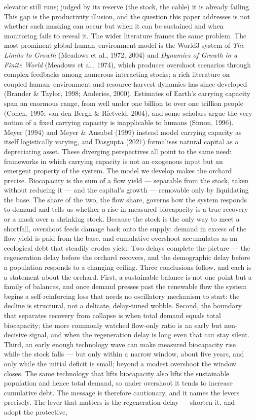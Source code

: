 \documentclass[11pt]{article}
\begin{document}
elevator still runs; judged by its reserve (the stock, the cable) it is already failing. This gap is the productivity illusion, and the question this paper addresses is not whether such masking can occur but when it can be sustained and when monitoring fails to reveal it. The wider literature frames the same problem. The most prominent global human–environment model is the World3 system of \emph{The Limits to Growth} (Meadows et al., 1972, 2004) and \emph{Dynamics of Growth in a Finite World} (Meadows et al., 1974), which produces overshoot scenarios through complex feedbacks among numerous interacting stocks; a rich literature on coupled human–environment and resource-harvest dynamics has since developed (Brander \& Taylor, 1998; Anderies, 2000). Estimates of Earth's carrying capacity span an enormous range, from well under one billion to over one trillion people (Cohen, 1995; van den Bergh \& Rietveld, 2004), and some scholars argue the very notion of a fixed carrying capacity is inapplicable to humans (Simon, 1996). Meyer (1994) and Meyer \& Ausubel (1999) instead model carrying capacity as itself logistically varying, and Dasgupta (2021) formalises natural capital as a depreciating asset. These diverging perspectives all point to the same need: frameworks in which carrying capacity is not an exogenous input but an emergent property of the system. The model we develop makes the orchard precise. Biocapacity is the sum of a flow yield — separable from the stock, taken without reducing it — and the capital's growth — removable only by liquidating the base. The share of the two, the flow share, governs how the system responds to demand and tells us whether a rise in measured biocapacity is a true recovery or a mask over a shrinking stock. Because the stock is the only way to meet a shortfall, overshoot feeds damage back onto the supply: demand in excess of the flow yield is paid from the base, and cumulative overshoot accumulates as an ecological debt that steadily erodes yield. Two delays complete the picture — the regeneration delay before the orchard recovers, and the demographic delay before a population responds to a changing ceiling. Three conclusions follow, and each is a statement about the orchard. First, a sustainable balance is not one point but a family of balances, and once demand presses past the renewable flow the system begins a self-reinforcing loss that needs no oscillatory mechanism to start: the decline is structural, not a delicate, delay-tuned wobble. Second, the boundary that separates recovery from collapse is when total demand equals total biocapacity; the more commonly watched flow-only ratio is an early but non-decisive signal, and when the regeneration delay is long even that can stay silent. Third, an early enough technology wave can make measured biocapacity rise while the stock falls — but only within a narrow window, about five years, and only while the initial deficit is small; beyond a modest overshoot the window closes. The same technology that lifts biocapacity also lifts the sustainable population and hence total demand, so under overshoot it tends to increase cumulative debt. The message is therefore cautionary, and it names the levers precisely. The lever that matters is the regeneration delay — shorten it, and adopt the protective, 
\end{document}
